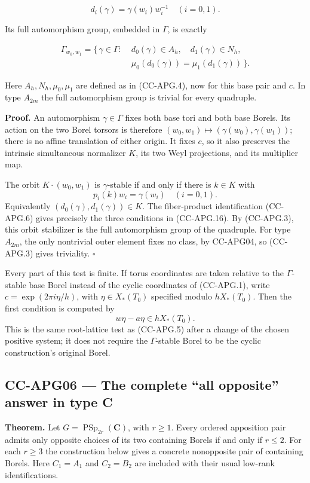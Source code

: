 \[
 d_i(\gamma)=\gamma(w_i)w_i^{-1}\quad(i=0,1).
\]

Its full automorphism group, embedded in \(\Gamma\), is exactly

\[
\begin{split}
 \Gamma_{w_0,w_1}=\{\,\gamma\in\Gamma:\;&
 d_0(\gamma)\in A_h,\quad d_1(\gamma)\in N_h,\\
 &\mu_0(d_0(\gamma))=\mu_1(d_1(\gamma))\,\}.
\end{split}
 \tag{CC-APG.16}
\]

Here \(A_h,N_h,\mu_0,\mu_1\) are defined as in (CC-APG.4), now for this
base pair and \(c\). In type \(A_{2m}\) the full automorphism group is
trivial for every quadruple.

\textbf{Proof.} An automorphism \(\gamma\in\Gamma\) fixes both base tori
and both base Borels. Its action on the two Borel torsors is therefore
\((w_0,w_1)\mapsto(\gamma(w_0),\gamma(w_1))\); there is no affine
translation of either origin. It fixes \(c\), so it also preserves the
intrinsic simultaneous normalizer \(K\), its two Weyl projections, and
its multiplier map.

The orbit \(K\cdot(w_0,w_1)\) is \(\gamma\)-stable if and only if there
is \(k\in K\) with \[
 p_i(k)w_i=\gamma(w_i)\quad(i=0,1).
\] Equivalently \((d_0(\gamma),d_1(\gamma))\in K\). The fiber-product
identification (CC-APG.6) gives precisely the three conditions in
(CC-APG.16). By (CC-APG.3), this orbit stabilizer is the full
automorphism group of the quadruple. For type \(A_{2m}\), the only
nontrivial outer element fixes no class, by CC-APG04, so (CC-APG.3)
gives triviality. \(\square\)

Every part of this test is finite. If torus coordinates are taken
relative to the \(\Gamma\)-stable base Borel instead of the cyclic
coordinates of (CC-APG.1), write \(c=\exp(2\pi i\eta/h)\), with
\(\eta\in X_*(T_0)\) specified modulo \(hX_*(T_0)\). Then the first
condition is computed by \[
 w\eta-a\eta\in hX_*(T_0).
\] This is the same root-lattice test as (CC-APG.5) after a change of
the chosen positive system; it does not require the \(\Gamma\)-stable
Borel to be the cyclic construction's original Borel.

\subsection{CC-APG06 --- The complete ``all opposite'' answer in type
C}\label{cc-apg06-the-complete-all-opposite-answer-in-type-c}

\textbf{Theorem.} Let \(G=\operatorname{PSp}_{2r}(\mathbf C)\), with
\(r\geq1\). Every ordered apposition pair admits only opposite choices
of its two containing Borels if and only if \(r\leq2\). For each
\(r\geq3\) the construction below gives a concrete nonopposite pair of
containing Borels. Here \(C_1=A_1\) and \(C_2=B_2\) are included with
their usual low-rank identifications.

